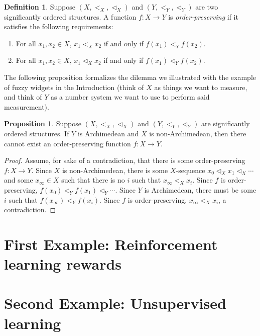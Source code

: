 \documentclass[reqno]{article}
\theoremstyle{definition}
\newtheorem{proposition}[theorem]{Proposition}
\newtheorem{definition}{Definition}
\begin{document}
\begin{definition}
    Suppose $(X,<_X,\vartriangleleft_X)$ and $(Y,<_Y,\vartriangleleft_Y)$
    are two significantly ordered structures.
    A function $f:X\to Y$ is \emph{order-preserving} if it satisfies the following
    requirements:
    \begin{enumerate}
        \item
            For all $x_1,x_2\in X$, $x_1<_X x_2$ if and only if $f(x_1)<_Yf(x_2)$.
        \item
            For all $x_1,x_2\in X$, $x_1\vartriangleleft_X x_2$ if and only if
            $f(x_1)\vartriangleleft_Yf(x_2)$.
    \end{enumerate}
\end{definition}

The following proposition formalizes the dilemma we illustrated with the
example of fuzzy widgets in the Introduction (think of $X$ as things we
want to measure, and think of $Y$ as a number system we want to use to
perform said measurement).

\begin{proposition}
    Suppose $(X,<_X,\vartriangleleft_X)$ and $(Y,<_Y,\vartriangleleft_Y)$
    are significantly ordered structures.
    If $Y$ is Archimedean and $X$ is non-Archimedean, then there cannot exist
    an order-preserving function $f:X\to Y$.
\end{proposition}

\begin{proof}
    Assume, for sake of a contradiction, that there is some order-preserving
    $f:X\to Y$.
    Since $X$ is non-Archimedean, there is some $X$-sequence
    $x_0\vartriangleleft_X x_1\vartriangleleft_X \cdots$ and some
    $x_\infty\in X$ such that there is no $i$ such that $x_\infty<_X x_i$.
    Since $f$ is order-preserving,
    $f(x_0)\vartriangleleft_Y f(x_1) \vartriangleleft_Y \cdots$.
    Since $Y$ is Archimedean, there must be some $i$ such that
    $f(x_\infty)<_Y f(x_i)$.
    Since $f$ is order-preserving, $x_\infty<_X x_i$, a contradiction.
\end{proof}

\section{First Example: Reinforcement learning rewards}

\section{Second Example: Unsupervised learning}
\end{document}
